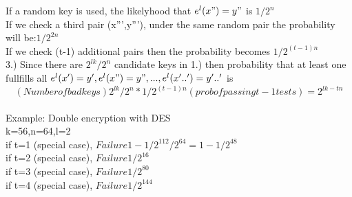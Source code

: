 \documentclass[12pt,letterpaper]{article}
\begin{document}
If a random key is used, the likelyhood that \(e^l(x")=y"\) is \(1/2^n\)\\ 

If we check a third pair (x''',y'''), under the same random pair the probability will be:\(1/2^{2n}\)\\

If we check (t-1) additional pairs then the probability becomes \( 1/2^{(t-1)n}\)\\


3.) Since there are \(2^{lk}/2^n\) candidate keys in 1.) then probability that at least one fullfills all \(e^l(x')=y',e^l(x")=y",...,e^l(x'..')=y'..'\) is \[(Number of bad keys)2^{lk}/2^n*1/2^{(t-1)n}(prob of passing t-1 tests)=2^{lk-tn}\]\\


Example: Double encryption with DES\\
k=56,n=64,l=2\\
if t=1 (special case), \(Failure 1-1/2^{112}/2^{64}=1-1/2^48\)\\
if t=2 (special case), \(Failure 1/2^{16}\)\\
if t=3 (special case), \(Failure 1/2^{80}\)\\
if t=4 (special case), \(Failure 1/2^{144}\)\\
\end{document}

